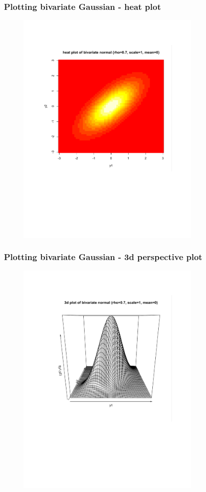 \documentclass[handout]{beamer}
\begin{document}
\begin{frame}
\frametitle{Plotting bivariate Gaussian - heat plot}
\begin{figure}[!t]
\centerline{\includegraphics[width=9cm]{lecture10fig2}}
\end{figure}
\end{frame}

\begin{frame}
\frametitle{Plotting bivariate Gaussian - 3d perspective plot}
\begin{figure}[!t]
\centerline{\includegraphics[width=9cm]{lecture10fig3}}
\end{figure}
\end{frame}
\end{document}
